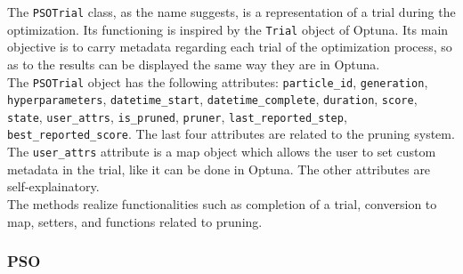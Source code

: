 The \texttt{PSOTrial} class, as the name suggests, is a representation of a trial during the optimization. Its functioning is inspired by the \texttt{Trial} object of Optuna.
Its main objective is to carry metadata regarding each trial of the optimization process, so as to the results can be displayed the same way they are in Optuna.
% 
\\[0.3cm]The \texttt{PSOTrial} object has the following attributes: \texttt{particle\_id}, \texttt{generation}, \newline\texttt{hyperparameters}, \texttt{datetime\_start}, \texttt{datetime\_complete}, \texttt{duration}, \texttt{score}, \texttt{state}, \texttt{user\_attrs}, \texttt{is\_pruned}, \texttt{pruner}, \texttt{last\_reported\_step}, \texttt{best\_reported\_score}.
The last four attributes are related to the pruning system. The \texttt{user\_attrs} attribute is a map object which allows the user to set custom metadata in the trial, like it can be done in Optuna. The other attributes are self-explainatory.
% 
\\[0.3cm]The methods realize functionalities such as completion of a trial, conversion to map, setters, and functions related to pruning.

\subsubsection{PSO}

